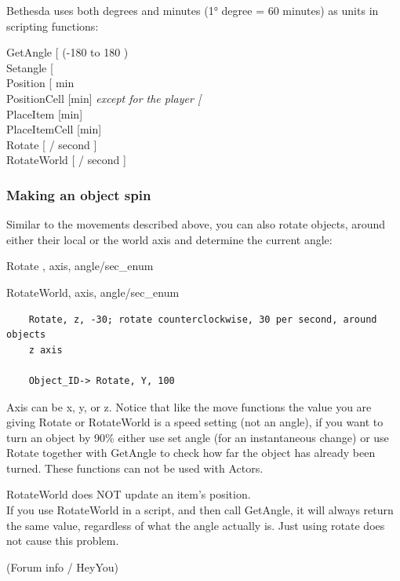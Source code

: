 Bethesda uses both degrees and minutes (1° degree = 60 minutes) as units in scripting functions:

	GetAngle {[}\textdegree{]} (-180 to 180 \textdegree)\\
	Setangle {[}\textdegree{]}\\
	Position {[} min \textdegree{]}\\
	PositionCell {[}min{]} \emph{except for the player {[}\textdegree{]}}\\
	PlaceItem {[}min{]}\\
	PlaceItemCell {[}min{]}\\
	Rotate {[} \textdegree / second {]}\\
	RotateWorld {[} \textdegree / second {]}

\hypertarget{making-an-object-spin}{%
\subsubsection{Making an object spin}\label{making-an-object-spin}}

Similar to the movements described above, you can also rotate objects,
around either their local or the world axis and determine the current
angle:


	Rotate , axis, angle/sec\_enum
	
	RotateWorld, axis, angle/sec\_enum

\begin{lstlisting}	
	Rotate, z, -30; rotate counterclockwise, 30 per second, around objects
	z axis
	
	Object_ID-> Rotate, Y, 100
\end{lstlisting}

Axis can be x, y, or z. Notice that like the move functions the value
you are giving Rotate or RotateWorld is a speed setting (not an angle),
if you want to turn an object by 90\% either use set angle (for an
instantaneous change) or use Rotate together with GetAngle to check how
far the object has already been turned. These functions can not be used
with Actors.

RotateWorld does NOT update an item's position.\\
If you use RotateWorld in a script, and then call GetAngle, it will
always return the same value, regardless of what the angle actually is.
Just using rotate does not cause this problem.

(Forum info / HeyYou)

